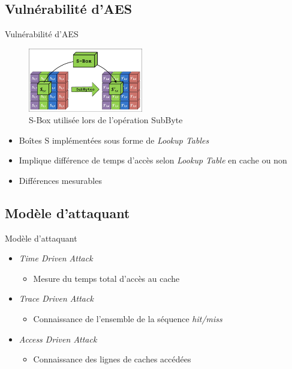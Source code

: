 \documentclass[11pt]{beamer}
\begin{document}
\subsection{Vulnérabilité d'AES}
\begin{frame}{Vulnérabilité d'AES}
\begin{figure}[h]
  		\centering
  		\includegraphics[width=5cm]{figures/s_box.jpg}
  		\caption{S-Box utilisée lors de l'opération SubByte}
  		\label{sbox} 
	\end{figure}
	\begin{itemize}
		\item Boîtes S implémentées sous forme de \emph{Lookup Tables}
		\item Implique différence de temps d'accès selon \emph{Lookup Table} en cache ou non
		\item Différences mesurables
	\end{itemize}
\end{frame}

\subsection{Modèle d'attaquant}
\begin{frame}{Modèle d'attaquant}
	\begin{itemize}
		\item \emph{Time Driven Attack}
			\begin{itemize}
				\item Mesure du temps total d'accès au cache
			\end{itemize}
		\item \emph{Trace Driven Attack}
			\begin{itemize}
				\item Connaissance de l'ensemble de la séquence \emph{hit/miss}
			\end{itemize}
		\item \emph{Access Driven Attack}
			\begin{itemize}
				\item Connaissance des lignes de caches accédées
			\end{itemize}
	\end{itemize}
	
	
\end{frame}
\end{document}

